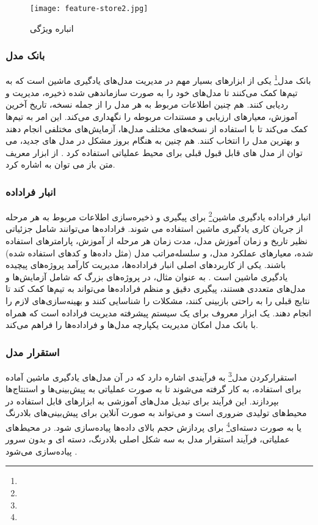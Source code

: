 \begin{figure}[t]
	\centering
	\texttt{[image: feature-store2.jpg]}
	\caption{انباره ویژگی}
	\label{fig: feature store}
\end{figure}

\subsubsection{بانک مدل}
بانک مدل\footnote{} یکی از ابزارهای بسیار مهم در مدیریت مدل‌های یادگیری ماشین است که به تیم‌ها کمک می‌کنند تا مدل‌های خود را به صورت سازماندهی شده ذخیره، مدیریت و ردیابی کنند. هم چنین اطلاعات مربوط به هر مدل را از جمله نسخه، تاریخ آخرین آموزش، معیارهای ارزیابی و مستندات مربوطه را نگهداری می‌کند. این امر به تیم‌ها کمک می‌کند تا با استفاده از نسخه‌های مختلف مدل‌ها، آزمایش‌های مختلفی انجام دهند و بهترین مدل را انتخاب کنند. هم چنین به هنگام بروز مشکل در مدل های جدید، می توان از مدل های قابل قبول قبلی برای محیط عملیاتی استفاده کرد \cite{MLOpsCloud1}. از ابزار معریف متن باز می توان به \cite{MLflow} اشاره کرد.

\subsubsection{انبار فراداده}
انبار فراداده یادگیری ماشین\footnote{} برای پیگیری و ذخیره‌سازی اطلاعات مربوط به هر مرحله از جریان کاری یادگیری ماشین استفاده می شوند. فراداده‌ها می‌توانند شامل جزئیاتی نظیر تاریخ و زمان آموزش مدل، مدت زمان هر مرحله از آموزش، پارامترهای استفاده شده، معیارهای عملکرد مدل، و سلسله‌مراتب مدل (مثل داده‌ها و کدهای استفاده شده) باشند. یکی از کاربردهای اصلی انبار فراداده‌ها، مدیریت کارآمد پروژه‌های پیچیده یادگیری ماشین است \cite{MLOpsProd2}. به عنوان مثال، در پروژه‌های بزرگ که شامل آزمایش‌ها و مدل‌های متعددی هستند، پیگیری دقیق و منظم فراداده‌ها می‌تواند به تیم‌ها کمک کند تا نتایج قبلی را به راحتی بازبینی کنند، مشکلات را شناسایی کنند و بهینه‌سازی‌های لازم را انجام دهند.   یک ابزار معروف برای یک سیستم پیشرفته مدیریت فراداده است که همراه با بانک مدل امکان مدیریت یکپارچه مدل‌ها و فراداده‌ها را فراهم می‌کند. 	

\subsubsection{استقرار مدل}
استقرارکردن مدل\footnote{} به فرآیندی اشاره دارد که در آن مدل‌های یادگیری ماشین آماده برای استفاده، به کار گرفته می‌شوند تا به صورت عملیاتی به پیش‌بینی‌ها و استنتاج‌ها بپردازند. این فرآیند برای تبدیل مدل‌های آموزشی به ابزارهای قابل استفاده در محیط‌های تولیدی ضروری است و می‌تواند به صورت آنلاین برای پیش‌بینی‌های بلادرنگ یا به صورت دسته‌ای\footnote{} برای پردازش حجم بالای داده‌ها پیاده‌سازی شود. در محیط‌های عملیاتی، فرآیند استقرار مدل به سه شکل اصلی بلادرنگ، دسته ای و بدون سرور پیاده‌سازی می‌شود \cite{MLOpsCloud1}.


